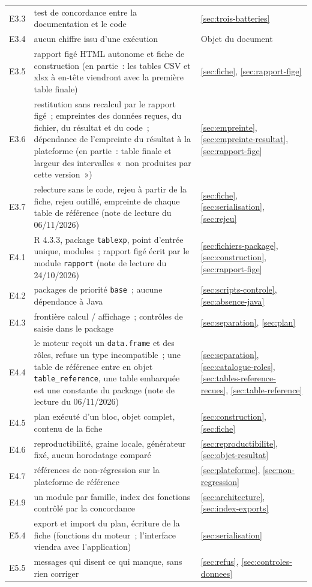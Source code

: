 \documentclass[a4paper,11pt]{article}
\newcommand{\code}[1]{\texttt{\small #1}}
\begin{document}
{\begin{longtable}{@{}p{1.6cm}p{8.6cm}p{4.6cm}@{}}
E3.3 & test de concordance entre la documentation et le code & \ref{sec:trois-batteries} \\
E3.4 & aucun chiffre issu d'une exécution & Objet du document \\
E3.5 & rapport figé HTML autonome et fiche de construction (en partie~: les tables CSV et xlsx à en-tête viendront avec la première table finale) & \ref{sec:fiche}, \ref{sec:rapport-fige} \\
E3.6 & restitution sans recalcul par le rapport figé~; empreintes des données reçues, du fichier, du résultat et du code~; dépendance de l'empreinte du résultat à la plateforme (en partie~: table finale et largeur des intervalles «~non produites par cette version~») & \ref{sec:empreinte}, \ref{sec:empreinte-resultat}, \ref{sec:rapport-fige} \\
E3.7 & relecture sans le code, rejeu à partir de la fiche, rejeu outillé, empreinte de chaque table de référence (note de lecture du 06/11/2026) & \ref{sec:fiche}, \ref{sec:serialisation}, \ref{sec:rejeu} \\
E4.1 & R 4.3.3, package \code{tablexp}, point d'entrée unique, modules~; rapport figé écrit par le module \code{rapport} (note de lecture du 24/10/2026) & \ref{sec:fichiers-package}, \ref{sec:construction}, \ref{sec:rapport-fige} \\
E4.2 & packages de priorité \code{base}~; aucune dépendance à Java & \ref{sec:scripts-controle}, \ref{sec:absence-java} \\
E4.3 & frontière calcul / affichage~; contrôles de saisie dans le package & \ref{sec:separation}, \ref{sec:plan} \\
E4.4 & le moteur reçoit un \code{data.frame} et des rôles, refuse un type incompatible~; une table de référence entre en objet \code{table\_reference}, une table embarquée est une constante du package (note de lecture du 06/11/2026) & \ref{sec:separation}, \ref{sec:catalogue-roles}, \ref{sec:tables-reference-recues}, \ref{sec:table-reference} \\
E4.5 & plan exécuté d'un bloc, objet complet, contenu de la fiche & \ref{sec:construction}, \ref{sec:fiche} \\
E4.6 & reproductibilité, graine locale, générateur fixé, aucun horodatage comparé & \ref{sec:reproductibilite}, \ref{sec:objet-resultat} \\
E4.7 & références de non-régression sur la plateforme de référence & \ref{sec:plateforme}, \ref{sec:non-regression} \\
E4.9 & un module par famille, index des fonctions contrôlé par la concordance & \ref{sec:architecture}, \ref{sec:index-exports} \\
E5.4 & export et import du plan, écriture de la fiche (fonctions du moteur~; l'interface viendra avec l'application) & \ref{sec:serialisation} \\
E5.5 & messages qui disent ce qui manque, sans rien corriger & \ref{sec:refus}, \ref{sec:controles-donnees} \\
\end{longtable}
}
\end{document}
